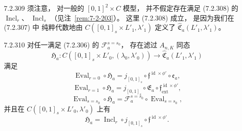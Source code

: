 \begin{remark}{7.2.309}\label{rem:7-2-309}
须注意，
对一般的 $[0,1]^2\times C$ 模型，
并不假定存在满足 (7.2.308) 的
$\operatorname{Incl}_r$、
$\operatorname{Incl}_s$
（见注~\ref{rem:7-2-203}）。
这里 (7.2.308) 成立，
是因为我们在 (7.2.307) 中
纯粹代数地由
$C([0,1]_s\times L'_1,\lambda'_1)$
定义了
$\widehat{\mathfrak C}_a(L'_1,\lambda'_1)$。
\end{remark}

\begin{lemma}{7.2.310}\label{lem:7-2-310}
对任一满足 (7.2.306) 的
$\mathcal F_a^{s=s_0}$，
存在滤过 $A_{n,K}$ 同态
\[
\mathfrak H_a\colon
C([0,1]_s\times L'_0,(\lambda_0,\lambda'_0))
\longrightarrow
\widehat{\mathfrak C}_a(L'_1,\lambda'_1)
\]
满足
\begin{equation}
\operatorname{Eval}_{r=0}\circ\mathfrak H_a
=j_{[0,1]_s}\circ
\mathfrak f^{\operatorname{id}\times\phi'}
\circ\mathfrak e_a,
\tag{7.2.311.1}\label{eq:7-2-311-1}
\end{equation}
\begin{equation}
\operatorname{Eval}_{r=1}\circ\mathfrak H_a
=j_{[0,1]_s}\circ\mathfrak E_a\circ
\mathfrak f^{\operatorname{id}\times\phi'}_{\mathrm{ext}},
\tag{7.2.311.2}\label{eq:7-2-311-2}
\end{equation}
\begin{equation}
\operatorname{Eval}_{s=s_0}\circ\mathfrak H_a
=\mathcal F_a^{s=s_0}
\circ\operatorname{Eval}_{s=s_0},
\tag{7.2.311.3}\label{eq:7-2-311-3}
\end{equation}
并且在
$C([0,1]_s\times L'_0,\lambda'_0)$
上有
\begin{equation}
\mathfrak H_a
=\operatorname{Incl}_r\circ j_{[0,1]_s}
\circ\mathfrak f^{\operatorname{id}\times\phi'}.
\tag{7.2.311.4}\label{eq:7-2-311-4}
\end{equation}
\end{lemma}

